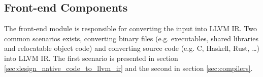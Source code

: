 
\subsection{Front-end Components}
\label{sec:front-end_components}

The front-end module is responsible for converting the input into LLVM IR. Two common scenarios exists, converting binary files (e.g. executables, shared libraries and relocatable object code) and converting source code (e.g. C, Haskell, Rust, …) into LLVM IR. The first scenario is presented in section \ref{sec:design_native_code_to_llvm_ir} and the second in section \ref{sec:compilers}.




